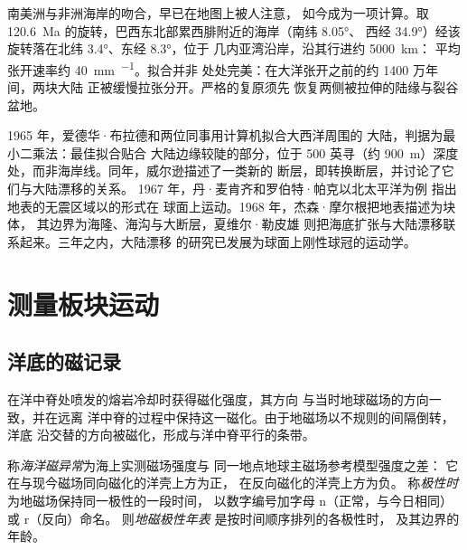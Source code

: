 南美洲与非洲海岸的吻合，早已在地图上被人注意，
如今成为一项计算。取
\qty{120.6}{Ma} 的旋转，巴西东北部累西腓附近的海岸（南纬 \ang{8.05}、
西经 \ang{34.9}）经该旋转落在北纬 \ang{3.4}、东经 \ang{8.3}，位于
几内亚湾沿岸，沿其行进约 \qty{5000}{km}：
平均张开速率约 \qty{40}{mm.^{-1}}。拟合并非
处处完美：在大洋张开之前的约 1400 万年间，两块大陆
正被缓慢拉张分开。严格的复原须先
恢复两侧被拉伸的陆缘与裂谷盆地。

\begin{history}[球面上的板块运动]
1965 年，爱德华·布拉德和两位同事用计算机拟合大西洋周围的
大陆，判据为最小二乘法：最佳拟合贴合
大陆边缘较陡的部分，位于 500 英寻（约
\qty{900}{m}）深度处，而非海岸线。同年，威尔逊描述了一类新的
断层，即转换断层，并讨论了它们与大陆漂移的关系。
1967 年，丹·麦肯齐和罗伯特·帕克以北太平洋为例
指出地表的无震区域以的形式在
球面上运动。1968 年，杰森·摩尔根把地表描述为块体，
其边界为海隆、海沟与大断层，夏维尔·勒皮雄
则把海底扩张与大陆漂移联系起来。三年之内，大陆漂移
的研究已发展为球面上刚性球冠的运动学。
\end{history}

\section{测量板块运动}

\subsection*{洋底的磁记录}

在洋中脊处喷发的熔岩冷却时获得磁化强度，其方向
与当时地球磁场的方向一致，并在远离
洋中脊的过程中保持这一磁化。由于地磁场以不规则的间隔倒转，洋底
沿交替的方向被磁化，形成与洋中脊平行的条带。

\begin{definition}\label{def:b1:plate-kinematics:magnetic-anomaly}
称\emph{海洋磁异常}为海上实测磁场强度与
同一地点地球主磁场参考模型强度之差：
它在与现今磁场同向磁化的洋壳上方为正，
在反向磁化的洋壳上方为负。
称\emph{极性时
}为地磁场保持同一极性的一段时间，
以数字编号加字母 n（正常，与今日相同）或 r（反向）命名。
则\emph{地磁极性年表
}是按时间顺序排列的各极性时，
及其边界的年龄。
\end{definition}

